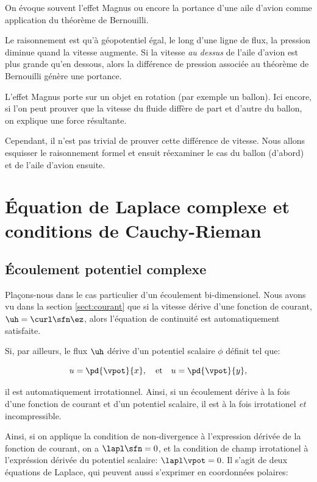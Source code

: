 On évoque souvent l'effet Magnus ou encore la portance d'une aile d'avion comme application du théorème de Bernouilli. 

Le raisonnement est qu'à géopotentiel égal, le long d'une ligne de flux, la pression diminue quand la vitesse augmente. Si la vitesse \emph{au dessus} de l'aile d'avion est plus grande qu'en dessous, alors la différence de pression associée au théorème de Bernouilli génère une portance. 

L'effet Magnus porte sur un objet en rotation (par exemple un ballon). Ici encore, si l'on peut prouver que la vitesse du fluide diffère de part et d'autre du ballon, on explique une force résultante. 

Cependant, il n'est pas trivial de prouver cette différence de vitesse. Nous allons esquisser le raisonnement formel et ensuit réexaminer le cas du ballon (d'abord) et de l'aile d'avion ensuite. 

\section{Équation de Laplace complexe et conditions de Cauchy-Rieman}

\subsection{Écoulement potentiel complexe}

Plaçons-nous dans le cas particulier d'un écoulement bi-dimensionel.  Nous avons vu dans la section \ref{sect:courant} que si la vitesse dérive d'une fonction de courant, $\uh = \curl \sfn \ez$, alors l'équation de continuité est automatiquement satisfaite. 

Si, par ailleurs, le flux $\uh$ dérive d'un potentiel scalaire $\phi$ définit tel que: 

\begin{displaymath}
  u = \pd{\vpot}{x}, \quad \text{et}\quad u = \pd{\vpot}{y}, 
\end{displaymath}

il est automatiquement irrotationnel. Ainsi, si un écoulement dérive à la fois d'une fonction de courant et d'un potentiel scalaire, il est à la fois irrotationel \emph{et} incompressible. 

Ainsi, si on applique la condition de non-divergence à l'expression dérivée de la fonction de courant, on a $\lapl\sfn=0$, et la condition de champ irrotationel à l'expréssion dérivée du potentiel scalaire: $\lapl\vpot=0$. Il s'agit de deux équations de Laplace, qui peuvent aussi s'exprimer en coordonnées polaires:


